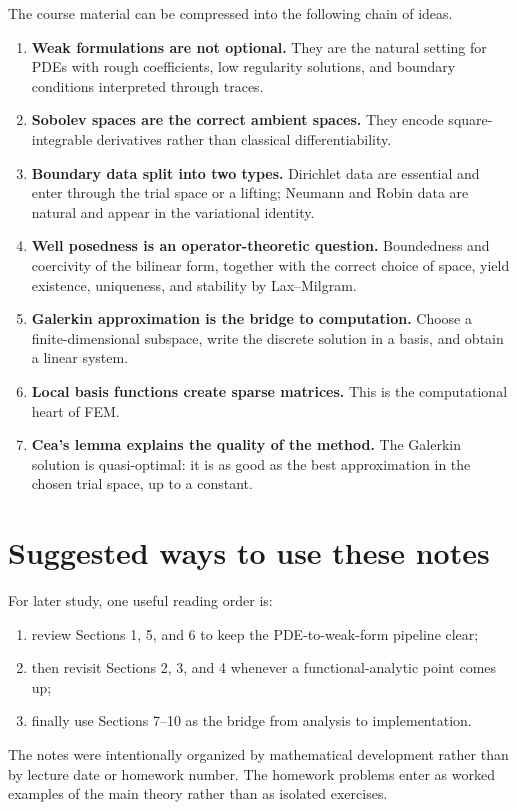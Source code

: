 \documentclass[11pt]{article}
\theoremstyle{definition}
\begin{document}
The course material can be compressed into the following chain of ideas.

\begin{enumerate}
    \item \textbf{Weak formulations are not optional.} They are the natural setting for PDEs with rough coefficients, low regularity solutions, and boundary conditions interpreted through traces.
    \item \textbf{Sobolev spaces are the correct ambient spaces.} They encode square-integrable derivatives rather than classical differentiability.
    \item \textbf{Boundary data split into two types.} Dirichlet data are essential and enter through the trial space or a lifting; Neumann and Robin data are natural and appear in the variational identity.
    \item \textbf{Well posedness is an operator-theoretic question.} Boundedness and coercivity of the bilinear form, together with the correct choice of space, yield existence, uniqueness, and stability by Lax--Milgram.
    \item \textbf{Galerkin approximation is the bridge to computation.} Choose a finite-dimensional subspace, write the discrete solution in a basis, and obtain a linear system.
    \item \textbf{Local basis functions create sparse matrices.} This is the computational heart of FEM.
    \item \textbf{Cea's lemma explains the quality of the method.} The Galerkin solution is quasi-optimal: it is as good as the best approximation in the chosen trial space, up to a constant.
\end{enumerate}

\section*{Suggested ways to use these notes}

For later study, one useful reading order is:
\begin{enumerate}
    \item review Sections 1, 5, and 6 to keep the PDE-to-weak-form pipeline clear;
    \item then revisit Sections 2, 3, and 4 whenever a functional-analytic point comes up;
    \item finally use Sections 7--10 as the bridge from analysis to implementation.
\end{enumerate}

The notes were intentionally organized by mathematical development rather than by lecture date or homework number. The homework problems enter as worked examples of the main theory rather than as isolated exercises.
\end{document}
